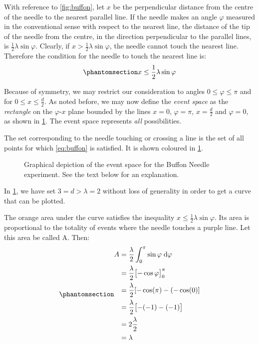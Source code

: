 \documentclass[
  a4paper,
]{article}
\begin{document}
With reference to \cref{fig:buffon}, let \(x\) be the perpendicular
distance from the centre of the needle to the nearest parallel line. If
the needle makes an angle \(\varphi\) measured in the conventional sense
with respect to the nearest line, the distance of the tip of the needle
from the centre, in the direction perpendicular to the parallel lines,
is \(\frac{1}{2}\lambda\sin\varphi\). Clearly, if
\(x > \frac{1}{2}\lambda\sin\varphi\), the needle cannot touch the
nearest line. Therefore the condition for the needle to touch the
nearest line is: \begin{equation}\phantomsection\label{eq:buffon}{
x \leq \frac{1}{2}\lambda\sin\varphi
}\end{equation}

Because of symmetry, we may restrict our consideration to angles
\(0 \leq \varphi \leq \pi\) and for \(0 \leq x \leq \frac{d}{2}\). As
noted before, we may now define the \emph{event space} as the
\emph{rectangle} on the \(\varphi\)-\(x\) plane bounded by the lines
\(x=0\), \(\varphi = \pi\), \(x = \frac{d}{2}\) and \(\varphi = 0\), as
shown in \cref{fig:plot}. The event space represents \emph{all}
possibilities.

The set corresponding to the needle touching or crossing a line is the
set of all points for which \cref{eq:buffon} is satisfied. It is shown
coloured in \cref{fig:plot}.

\begin{figure}
\centering

\caption{Graphical depiction of the event space for the Buffon Needle
experiment. See the text below for an explanation.}\label{fig:plot}
\end{figure}

In \cref{fig:plot}, we have set \(3 = d > \lambda = 2\) without loss of
generality in order to get a curve that can be plotted.

The orange area under the curve satisfies the inequality
\(x \leq \frac{1}{2}\lambda\sin\varphi\). Its area is proportional to
the totality of events where the needle touches a purple line. Let this
area be called A. Then:
\begin{equation}\phantomsection\label{eq:successes}{
\begin{aligned}
A &= \frac{\lambda}{2}\int_0^{\pi}\sin\varphi\;\mathrm{d}\varphi\\
&= \frac{\lambda}{2}\displaystyle\bigl[-\cos\varphi\bigr]_0^{\pi}\\
&= \frac{\lambda}{2}[-\cos(\pi) - (-\cos(0)]\\
&= \frac{\lambda}{2}\displaystyle\bigl[-(-1) -(-1)\bigr]\\
&= 2\frac{\lambda}{2}\\
&= \lambda
\end{aligned}
}\end{equation}
\end{document}
